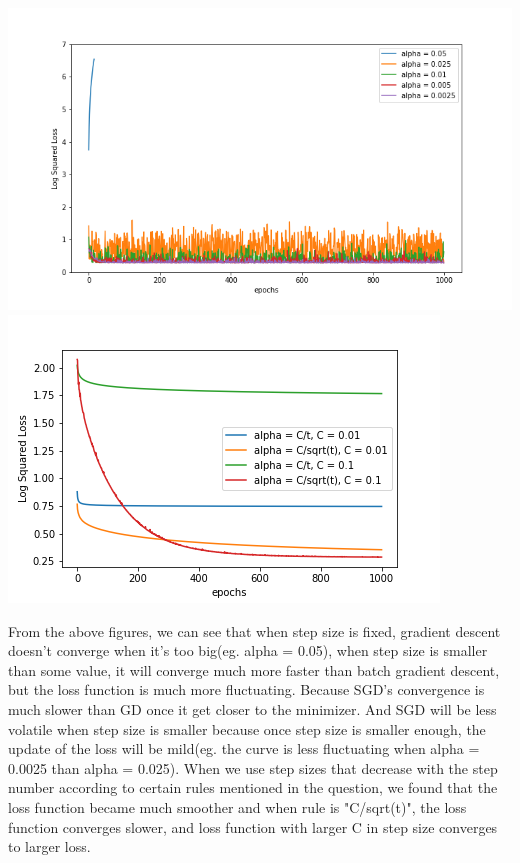 \documentclass{article}
\begin{document}
\begin{center}
\includegraphics[scale=0.6]{3651.png}
\includegraphics[scale=0.9]{3652.png}
\end{center}
From the above figures, we can see that when step size is fixed, gradient descent doesn't converge when it's too big(eg. alpha = 0.05), when step size is smaller than some value, it will converge much more faster than batch gradient descent, but the loss function is much more fluctuating. Because SGD's convergence is much slower than GD once it get closer to the minimizer. And SGD will be less volatile when step size is smaller because once step size is smaller enough, the update of the loss will be mild(eg. the curve is less fluctuating when alpha = 0.0025 than alpha = 0.025).
When we use step sizes that decrease with the step number according to certain rules mentioned in the question, we found that the loss function became much smoother and when rule is "C/sqrt(t)", the loss function converges slower, and loss function with larger C in step size converges to larger loss.
\endsubsection 
\end{document}
